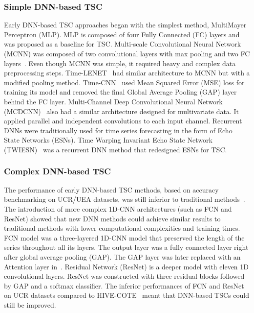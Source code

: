 \documentclass[journal]{IEEEtran}
\begin{document}
\subsubsection{\textbf{Simple DNN-based TSC}}
Early DNN-based TSC approaches began with the simplest method, MultiMayer Perceptron (MLP). MLP is composed of four Fully Connected (FC) layers and was proposed as a baseline for TSC. Multi-scale Convolutional Neural Network (MCNN) was composed of two convolutional layers with max pooling and two FC layers~\cite{MCNN}. Even though MCNN was simple, it required heavy and complex data preprocessing steps. Time-LENET~\cite{t-LENET} had similar architecture to MCNN but with a modified pooling method. Time-CNN~\cite{time-cnn} used Mean Squared Error (MSE) loss for training its model and removed the final Global Average Pooling (GAP) layer behind the FC layer. Multi-Channel Deep Convolutional Neural Network (MCDCNN)~\cite{MCDCNN} also had a similar architecture designed for multivariate data. It applied parallel and independent convolutions to each input channel. Recurrent DNNs were traditionally used for time series forecasting in the form of Echo State Networks (ESNs). Time Warping Invariant Echo State Network (TWIESN)~\cite{ TWIESN} was a recurrent DNN method that redesigned ESNs for TSC.

\subsubsection{\textbf{Complex DNN-based TSC}}
The performance of early DNN-based TSC methods, based on accuracy benchmarking on UCR/UEA datasets, was still inferior to traditional methods~\cite{rank1, 2021hive}. The introduction of more complex 1D-CNN architectures (such as FCN and ResNet) showed that new DNN methods could achieve similar results to traditional methods with lower computational complexities and training times. FCN model was a three-layered 1D-CNN model that preserved the length of the series throughout all its layers. The output layer was a fully connected layer right after global average pooling (GAP). The GAP layer was later replaced with an Attention layer in~\cite{encoder}. Residual Network (ResNet) is a deeper model with eleven 1D convolutional layers. ResNet was constructed with three residual blocks followed by GAP and a softmax classifier. The inferior performances of FCN and ResNet on UCR datasets compared to HIVE-COTE~\cite{rank1,dempster2020rocket} meant that DNN-based TSCs could still be improved.
\end{document}
